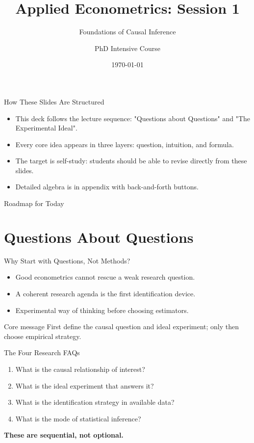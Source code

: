 \documentclass[11pt,aspectratio=169]{beamer}
\title{Applied Econometrics: Session 1}
\subtitle{Foundations of Causal Inference}
\author{PhD Intensive Course}
\institute{Lecture 1}
\date{\today}
\begin{document}
\begin{frame}
  \titlepage
\end{frame}

\begin{frame}{How These Slides Are Structured}
  \begin{itemize}
    \item This deck follows the lecture sequence: "Questions about Questions" and "The Experimental Ideal".
    \item Every core idea appears in three layers: question, intuition, and formula.
    \item The target is self-study: students should be able to revise directly from these slides.
    \item Detailed algebra is in appendix with back-and-forth buttons.
  \end{itemize}
\end{frame}

\begin{frame}{Roadmap for Today}
  \tableofcontents
\end{frame}

\section{Questions About Questions}

\begin{frame}{Why Start with Questions, Not Methods?}
  \begin{itemize}
    \item Good econometrics cannot rescue a weak research question.
    \item A coherent research agenda is the first identification device.
    \item Experimental way of thinking before choosing estimators.
  \end{itemize}
  \begin{block}{Core message}
    First define the causal question and ideal experiment; only then choose empirical strategy.
  \end{block}
\end{frame}

\begin{frame}{The Four Research FAQs}
  \begin{enumerate}
    \item What is the causal relationship of interest?
    \item What is the ideal experiment that answers it?
    \item What is the identification strategy in available data?
    \item What is the mode of statistical inference?
  \end{enumerate}
  \vspace{0.3em}
  \textbf{These are sequential, not optional.}
\end{frame}
\end{document}
